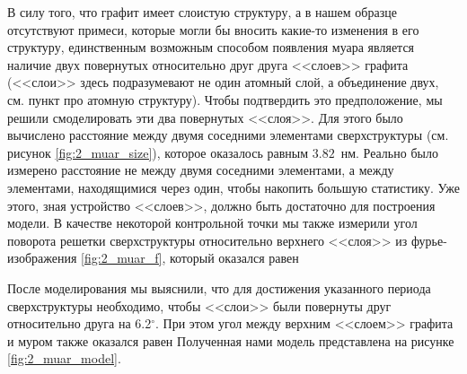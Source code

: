 \documentclass[a4paper, 12pt]{article}
\begin{document}
	В силу того, что графит имеет слоистую структуру, а в нашем образце отсутствуют примеси, которые могли бы вносить какие-то изменения в его структуру, единственным возможным способом появления муара является наличие двух повернутых относительно друг друга <<слоев>> графита (<<слои>> здесь подразумевают не один атомный слой, а объединение двух, см. пункт про атомную структуру). Чтобы подтвердить это предположение, мы решили смоделировать эти два повернутых <<слоя>>. Для этого было вычислено расстояние между двумя соседними элементами сверхструктуры (см. рисунок \ref{fig:2_muar_size}), которое оказалось равным $3.82$~нм. Реально было измерено расстояние не между двумя соседними элементами, а между элементами, находящимися через один, чтобы накопить большую статистику. Уже этого, зная устройство <<слоев>>, должно быть достаточно для построения модели. В качестве некоторой контрольной точки мы также измерили угол поворота решетки сверхструктуры относительно верхнего <<слоя>> из фурье-изображения \ref{fig:2_muar_f}, который оказался равен %
	
	После моделирования мы выяснили, что для достижения указанного периода сверхструктуры необходимо, чтобы <<слои>> были повернуты друг относительно друга на 6.2$^\circ$. При этом угол между верхним <<слоем>> графита и муром также оказался равен %
	Полученная нами модель представлена на рисунке \ref{fig:2_muar_model}.
	
\end{document}
